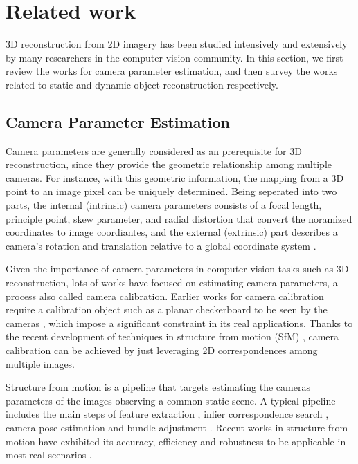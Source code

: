 \chapter{Related work}

3D reconstruction from 2D imagery has been studied intensively and extensively by many researchers in the computer vision community. In this section, we first review the works for camera parameter estimation, and then survey the works related to static and dynamic object reconstruction respectively.

\section{Camera Parameter Estimation}
Camera parameters are generally considered as an prerequisite for 3D reconstruction, since they provide the geometric relationship among multiple cameras. For instance, with this geometric information, the mapping from a 3D point to an image pixel can be uniquely determined.
Being seperated into two parts, the internal (intrinsic) camera parameters consists of a focal length, principle point, skew parameter, and radial distortion that convert the noramized coordinates	 to image coordiantes, and the external (extrinsic) part describes a camera's rotation and translation relative to a global coordinate system \cite{Hartley2004}. 

Given the importance of camera parameters in computer vision tasks such as 3D reconstruction, lots of works have focused on estimating camera parameters, a process also called camera calibration. Earlier works for camera calibration require a calibration object such as a planar checkerboard to be seen by the cameras \cite{conf/cvpr/SturmM99,zhang2000flexible,caltoolbox}, which impose a significant constraint in its real applications. Thanks to the recent development of techniques in structure from motion (SfM) \cite{Snavely2,snavely2008modeling,WuVSFM,wilson2013network,heinly2014_duplicate_structure,schoenberger2015paige,Heinly,heinly_dissertation,zheng2015_structureless_resection}, camera calibration can be achieved by just leveraging 2D correspondences among multiple images. 

Structure from motion is a pipeline that targets estimating the cameras parameters of the images observing a common static scene. A typical pipeline includes the main steps of feature extraction \cite{lowe2004_sift,rublee2011_orb,bay2008_surf}, inlier correspondence search \cite{raguram2013usac}, camera pose estimation \cite{nister2003_five_point,kneip2011novel,zheng2014general,zheng2015_structureless_resection} and bundle adjustment \cite{agarwal2010_ba,wu2011_multicore_ba}. Recent works  in structure from motion have exhibited its accuracy, efficiency and robustness to be applicable in most real scenarios \cite{Snavely2,WuVSFM}.


